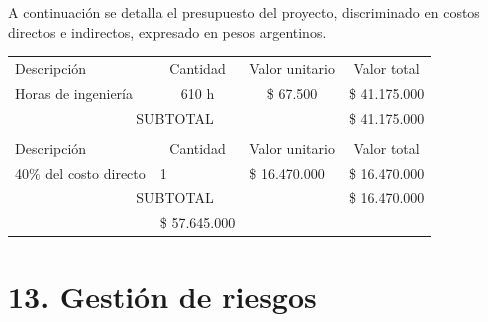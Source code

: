 \documentclass[
11pt, %
]{charter}
\begin{document}
A continuación se detalla el presupuesto del proyecto, discriminado en costos directos e indirectos, expresado en pesos argentinos.

\begin{table}[htpb]
\centering
\begin{tabularx}{\linewidth}{@{}|X|c|r|r|@{}}
\hline
\rowcolor[HTML]{C0C0C0} 
\multicolumn{4}{|c|}{\cellcolor[HTML]{C0C0C0}COSTOS DIRECTOS} \\ \hline
\rowcolor[HTML]{C0C0C0} 
Descripción &
  \multicolumn{1}{c|}{\cellcolor[HTML]{C0C0C0}Cantidad} &
  \multicolumn{1}{c|}{\cellcolor[HTML]{C0C0C0}Valor unitario} &
  \multicolumn{1}{c|}{\cellcolor[HTML]{C0C0C0}Valor total} \\ \hline
 Horas de ingeniería &
  \multicolumn{1}{c|}{610 h} &
  \multicolumn{1}{c|}{\$ 67.500 } &
  \multicolumn{1}{c|}{\$ 41.175.000 } \\ \hline
\multicolumn{3}{|c|}{SUBTOTAL} &
  \multicolumn{1}{c|}{\$ 41.175.000 } \\ \hline
\rowcolor[HTML]{C0C0C0} 
\multicolumn{4}{|c|}{\cellcolor[HTML]{C0C0C0}COSTOS INDIRECTOS} \\ \hline
\rowcolor[HTML]{C0C0C0} 
Descripción &
  \multicolumn{1}{c|}{\cellcolor[HTML]{C0C0C0}Cantidad} &
  \multicolumn{1}{c|}{\cellcolor[HTML]{C0C0C0}Valor unitario} &
  \multicolumn{1}{c|}{\cellcolor[HTML]{C0C0C0}Valor total} \\ \hline
  40\% del costo directo  &
	\multicolumn{1}{|l|}{1}&
	\multicolumn{1}{|l|}{\$ 16.470.000 }&
	\multicolumn{1}{|l|}{\$ 16.470.000 }
   \\ \hline
\multicolumn{3}{|c|}{SUBTOTAL} &
  \multicolumn{1}{c|}{\$ 16.470.000 } \\ \hline
\rowcolor[HTML]{C0C0C0}
\multicolumn{3}{|c|}{TOTAL} &
\$ 57.645.000
   \\ \hline
\end{tabularx}%
\end{table}


\section{13. Gestión de riesgos}
\label{sec:riesgos}
\end{document}
